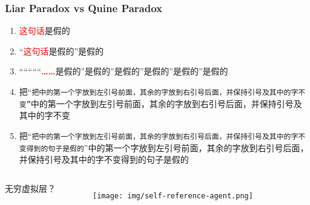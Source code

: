 \documentclass[UTF8,11pt,colorlinks,compress,openany]{beamer}%
\begin{document}
\begin{frame}\frametitle{Liar Paradox vs Quine Paradox}
\begin{enumerate}
\item \textcolor{red}{这句话}是假的
\item “\textcolor{red}{这句话}是假的”是假的
\item “““““\textcolor{red}{\textbf{……}}是假的”是假的”是假的”是假的”是假的”是假的
\item 把“\texttt{把中的第一个字放到左引号前面，其余的字放到右引号后面，并保持引号及其中的字不变”}中的第一个字放到左引号前面，其余的字放到右引号后面，并保持引号及其中的字不变
\item 把“\texttt{把中的第一个字放到左引号前面，其余的字放到右引号后面，并保持引号及其中的字不变得到的句子是假的}”中的第一个字放到左引号前面，其余的字放到右引号后面，并保持引号及其中的字不变得到的句子是假的
\end{enumerate}\vspace*{-5ex}
\begin{columns}
\begin{flushright}
\vspace*{7ex} 无穷虚拟层？
\end{flushright}
	\begin{figure}[H]\hspace*{-.6\textwidth}
		\texttt{[image: img/self-reference-agent.png]}
	\end{figure}
\end{columns}
\end{frame}
\end{document}

